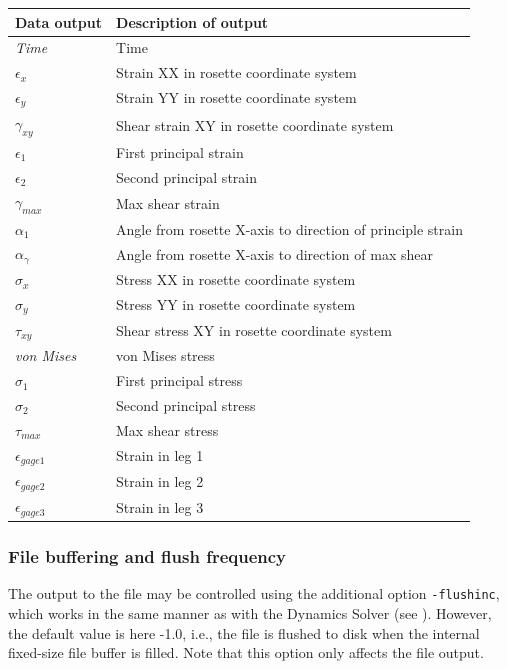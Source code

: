 {\begin{tabular}{| m{19mm} | m{85mm} |}
  \hline
  Data output    &  Description of output \\
  \hline\hline
  {\sl Time}     & Time \\
  $\epsilon_x$   & Strain XX in rosette coordinate system \\
  $\epsilon_y$   & Strain YY in rosette coordinate system \\
  $\gamma_{xy}$   & Shear strain XY in rosette coordinate system \\
  $\epsilon_1$   & First principal strain \\
  $\epsilon_2$   & Second principal strain \\
  $\gamma_{max}$  & Max shear strain \\
  $\alpha_1$     & Angle from rosette X-axis to direction of principle strain \\
  $\alpha_\gamma$ & Angle from rosette X-axis to direction of max shear \\
  $\sigma_x$     & Stress XX in rosette coordinate system \\
  $\sigma_y$     & Stress YY in rosette coordinate system \\
  $\tau_{xy}$     & Shear stress XY in rosette coordinate system \\
  {\sl von Mises} & von Mises stress \\
  $\sigma_1$      & First principal stress \\
  $\sigma_2$      & Second principal stress \\
  $\tau_{max}$     & Max shear stress \\
  $\epsilon_{gage1}$ & Strain in leg 1 \\
  $\epsilon_{gage2}$ & Strain in leg 2 \\
  $\epsilon_{gage3}$ & Strain in leg 3 \\
  \hline
\end{tabular}

\subsubsection{File buffering and flush frequency}

The output to the  file may be controlled using the additional option
{\tt-flushinc}, which works in the same manner as with the Dynamics Solver
(see ).
However, the default value is here -1.0, i.e., the file is flushed to disk
when the internal fixed-size file buffer is filled.
Note that this option only affects the  file output.

}
